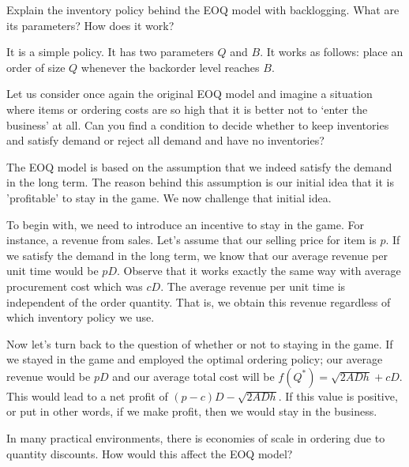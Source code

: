 \begin{question}
Explain the inventory policy behind the EOQ model with backlogging. What are its parameters? How does it work?
\end{question}

  \begin{solution}
It is a simple policy. It has two parameters $Q$ and $B$. It works as follows: place an order of size $Q$ whenever the backorder level reaches $B$.
  \end{solution}


\begin{question}
  Let us consider once again the original EOQ model and imagine a situation where items or ordering
  costs are so high that it is better not to `enter the business' at
  all. Can you find a condition to decide whether to keep inventories
  and satisfy demand or reject all demand and have no inventories?
\end{question}

  \begin{solution}
  
	The EOQ model is based on the assumption that we indeed satisfy the demand in the long term. The reason behind this assumption is our initial idea that it is 'profitable' to stay in the game. We now challenge that initial idea. 
	
	To begin with, we need to introduce an incentive to stay in the game. For instance, a revenue from sales. Let's assume that our selling price for item is $p$. If we satisfy the demand in the long term, we know that our average revenue per unit time would be $pD$. Observe that it works exactly the same way with average procurement cost which was $cD$. The average revenue per unit time is independent of the order quantity. That is, we obtain this revenue regardless of which inventory policy we use. 
	
	Now let's turn back to the question of whether or not to staying in the game. If we stayed in the game and employed the optimal ordering policy; our average revenue would be $pD$ and our average total cost will be $f(Q^*)=\sqrt{2ADh}+cD$. This would lead to a net profit of $(p-c)D-\sqrt{2ADh}$. If this value is positive, or put in other words, if we make profit, then we would stay in the business. 
  \end{solution}


\begin{question}
In many practical environments, there is economies of scale in ordering due to quantity discounts. How would this affect the EOQ model?
\end{question}


